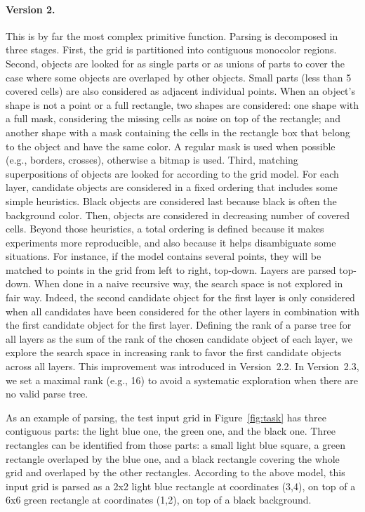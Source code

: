 \documentclass[a4paper]{llncs}
\begin{document}
\paragraph{Version 2.} This is by far the most complex primitive
function.
%
Parsing is decomposed in three stages. First, the grid is partitioned
into contiguous monocolor regions.
%
Second, objects are looked for as single parts or as unions of parts
to cover the case where some objects are overlaped by other
objects. Small parts (less than 5 covered cells) are also considered
as adjacent individual points. When an object's shape is not a point
or a full rectangle, two shapes are considered: one shape with a full
mask, considering the missing cells as noise on top of the rectangle;
and another shape with a mask containing the cells in the rectangle
box that belong to the object and have the same color. A regular mask
is used when possible (e.g., borders, crosses), otherwise a bitmap is
used.
%
Third, matching superpositions of objects are looked for according to
the grid model. For each layer, candidate objects are considered in a
fixed ordering that includes some simple heuristics. Black objects are
considered last because black is often the background color. Then,
objects are considered in decreasing number of covered cells. Beyond
those heuristics, a total ordering is defined because it makes
experiments more reproducible, and also because it helps disambiguate
some situations. For instance, if the model contains several points,
they will be matched to points in the grid from left to right,
top-down.
%
Layers are parsed top-down. When done in a naive recursive way, the
search space is not explored in fair way. Indeed, the second candidate
object for the first layer is only considered when all candidates have
been considered for the other layers in combination with the first
candidate object for the first layer. Defining the rank of a parse
tree for all layers as the sum of the rank of the chosen candidate
object of each layer, we explore the search space in increasing rank
to favor the first candidate objects across all layers. This
improvement was introduced in Version~2.2. In Version~2.3, we set a
maximal rank (e.g., 16) to avoid a systematic exploration when there
are no valid parse tree.

As an example of parsing, the test input grid in Figure~\ref{fig:task}
has three contiguous parts: the light blue one, the green one, and the
black one. Three rectangles can be identified from those parts: a
small light blue square, a green rectangle overlaped by the blue one,
and a black rectangle covering the whole grid and overlaped by the
other rectangles. According to the above model, this input grid is
parsed as a 2x2 light blue rectangle at coordinates (3,4), on top of a
6x6 green rectangle at coordinates (1,2), on top of a black
background.
\end{document}
